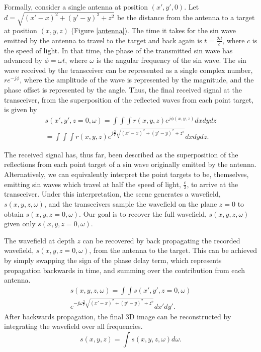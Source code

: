 \documentclass[twocolumn]{article}
\begin{document}
Formally, consider a single antenna at position $(x', y', 0)$. Let $d = \sqrt{(x'-x)^2+(y'-y)^2+z^2}$ be the distance from the antenna to a target at position $(x,y,z)$ (Figure \ref{antenna}). The time it takes for the sin wave emitted by the antenna to travel to the target and back again is $t = \frac{2d}{c}$, where $c$ is the speed of light. In that time, the phase of the transmitted sin wave has advanced by $\phi = \omega t$, where $\omega$ is the angular frequency of the sin wave. The sin wave received by the transceiver can be represented as a single complex number, $r e^{-j \phi}$, where the amplitude of the wave is represented by the magnitude, and the phase offset is represented by the angle. Thus, the final received signal at the transceiver, from the superposition of the reflected waves from each point target, is given by
%
\begin{gather}
s(x', y', z=0, \omega) = \int \int \int r(x,y,z) e^{j \phi(x,y,z)} dx dy dz \nonumber \\
= \int \int \int r(x,y,z) e^{j \frac{2}{c} \sqrt{(x'-x)^2 + (y'-y)^2 + z^2}} dx dy dz.
\end{gather}

The received signal has, thus far, been described as the superposition of the reflections from each point target of a sin wave originally emitted by the antenna. Alternatively, we can equivalently interpret the point targets to be, themselves, emitting sin waves which travel at half the speed of light, $\frac{c}{2}$, to arrive at the transceiver. Under this interpretation, the scene generates a wavefield, $s(x,y,z,\omega)$, and the transceivers sample the wavefield on the plane $z=0$ to obtain $s(x,y,z=0,\omega)$. Our goal is to recover the full wavefield, $s(x,y,z,\omega)$ given only $s(x,y,z=0,\omega)$.

The wavefield at depth $z$ can be recovered by back propagating the recorded wavefield, $s(x, y, z=0, \omega)$, from the antenna to the target. This can be achieved by simply swapping the sign of the phase delay term, which represents propagation backwards in time, and summing over the contribution from each antenna.
%
\begin{gather}
s(x,y,z,\omega) =\int\int s(x',y',z=0,\omega) \nonumber \\
e^{-j \omega \frac{2}{c} \sqrt{(x'-x)^{2}+(y'-y)^{2}+z^{2}}} dx'dy'.
\end{gather}
%
After backwards propagation, the final 3D image can be reconstructed by integrating the wavefield over all frequencies.
\begin{equation}
s(x,y,z)=\int s(x,y,z,\omega) d\omega.
\end{equation}
\end{document}
